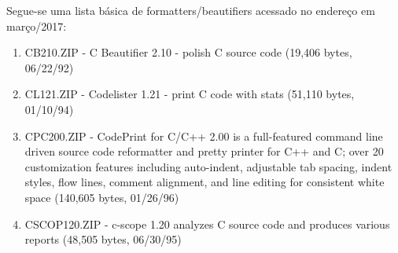 {\begin{myquote}
\begin{enumerate}[leftmargin=*,parsep=0pt]
    \end{enumerate}
    \end{myquote}

    Segue-se uma lista básica de formatters/beautifiers acessado no endereço
     em março/2017:

    \medskip
    \begin{sloppypar}
    \begin{myquote}\RaggedRight
    \begin{enumerate}[leftmargin=*,parsep=0pt]

        \item CB210.ZIP - C Beautifier 2.10 - polish C source code (19,406 bytes, 06/22/92)
        \item CL121.ZIP - Codelister 1.21 - print C code with stats (51,110 bytes, 01/10/94)

        \item CPC200.ZIP - CodePrint for C/C++ 2.00 is a full-featured command line driven source
        code reformatter and pretty printer for C++ and C; over 20 customization features including
        auto-indent, adjustable tab spacing, indent styles, flow lines, comment alignment, and line
        editing for consistent white space (140,605 bytes, 01/26/96)

        \item CSCOP120.ZIP - c-scope 1.20 analyzes C source code and produces various reports
        (48,505 bytes, 06/30/95)


\end{enumerate}
\end{myquote}
\end{sloppypar}}
